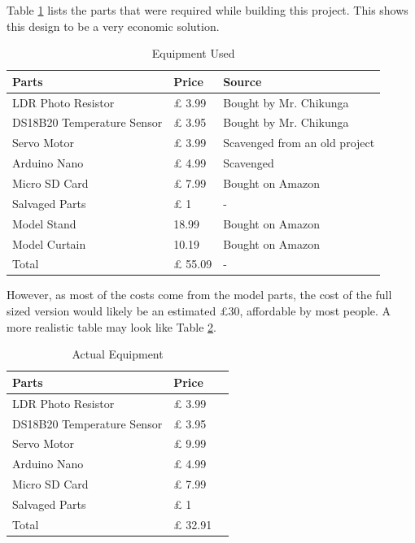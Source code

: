 \documentclass[a4paper,12pt]{article}
\begin{document}
Table \ref{tab:equipment} lists the parts that were required while building this project. This shows this design to be a very economic solution.


\begin{table}[h!]
    \caption{Equipment Used}
    \begin{tabular}{l | l | l}
        Parts & Price & Source \\
        \hline
        LDR Photo Resistor & £ 3.99 & Bought by Mr. Chikunga \\
        DS18B20 Temperature Sensor & £ 3.95 & Bought by Mr. Chikunga \\
        Servo Motor & £ 3.99 & Scavenged from an old project \\
        Arduino Nano & £ 4.99 & Scavenged \\
        Micro SD Card & £ 7.99 & Bought on Amazon \\
        Salvaged Parts & £ 1 & - \\
        Model Stand & 18.99 & Bought on Amazon \\
        Model Curtain & 10.19 & Bought on Amazon \\
        \hline
        Total & £ 55.09 & - \\
    \end{tabular}
    \label{tab:equipment}
\end{table}

However, as most of the costs come from the model parts, the cost of the full sized version would likely be an estimated £30, 
affordable by most people. A more realistic table may look like Table \ref{tab:realisticEquipment}.

\begin{table}[h!]
    \caption{Actual Equipment}
    \begin{tabular}{l | l | l}
        Parts & Price\\
        \hline
        LDR Photo Resistor & £ 3.99\\
        DS18B20 Temperature Sensor & £ 3.95\\
        Servo Motor & £ 9.99\\
        Arduino Nano & £ 4.99\\
        Micro SD Card & £ 7.99\\
        Salvaged Parts & £ 1\\
        \hline
        Total & £ 32.91\\
    \end{tabular}
    \label{tab:realisticEquipment}
\end{table}
\end{document}
